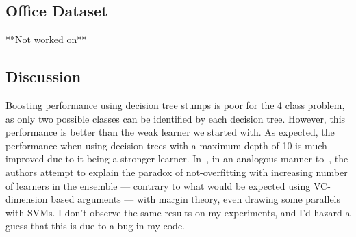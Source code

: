 \documentclass[5pt]{article}
\begin{document}
\subsection{Office Dataset}
**Not worked on**

\subsection{Discussion}
Boosting performance using decision tree stumps is poor for the 4 class
problem, as only two possible classes can be identified by each decision tree.
However, this performance is better than the weak learner we started with. As
expected, the performance when using decision trees with a maximum depth of 10
is much improved due to it being a stronger learner. In~\cite{freund1999short},
in an analogous manner to~\cite{breiman2001random}, the authors attempt to
explain the paradox of not-overfitting with increasing number of learners in
the ensemble --- contrary to what would be expected using VC-dimension based
arguments --- with margin theory, even drawing some parallels with SVMs. I don't
observe the same results on my experiments, and I'd hazard a guess that this is
due to a bug in my code.

\medskip


\end{document}
